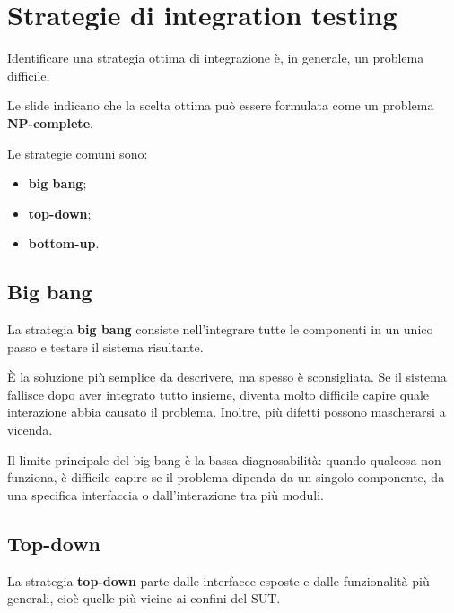 \section{Strategie di integration testing}

Identificare una strategia ottima di integrazione è, in generale, un problema difficile.

\begin{notaslide}
Le slide indicano che la scelta ottima può essere formulata come un problema \textbf{NP-complete}.
\end{notaslide}

Le strategie comuni sono:

\begin{itemize}
    \item \textbf{big bang};
    \item \textbf{top-down};
    \item \textbf{bottom-up}.
\end{itemize}



\subsection{Big bang}

La strategia \textbf{big bang} consiste nell'integrare tutte le componenti in un unico passo e testare il sistema risultante.

\begin{notaprof}
È la soluzione più semplice da descrivere, ma spesso è sconsigliata. Se il sistema fallisce dopo aver integrato tutto insieme, diventa molto difficile capire quale interazione abbia causato il problema. Inoltre, più difetti possono mascherarsi a vicenda.
\end{notaprof}

\begin{notaesame}
Il limite principale del big bang è la bassa diagnosabilità: quando qualcosa non funziona, è difficile capire se il problema dipenda da un singolo componente, da una specifica interfaccia o dall'interazione tra più moduli.
\end{notaesame}

\subsection{Top-down}

La strategia \textbf{top-down} parte dalle interfacce esposte e dalle funzionalità più generali, cioè quelle più vicine ai confini del SUT.

